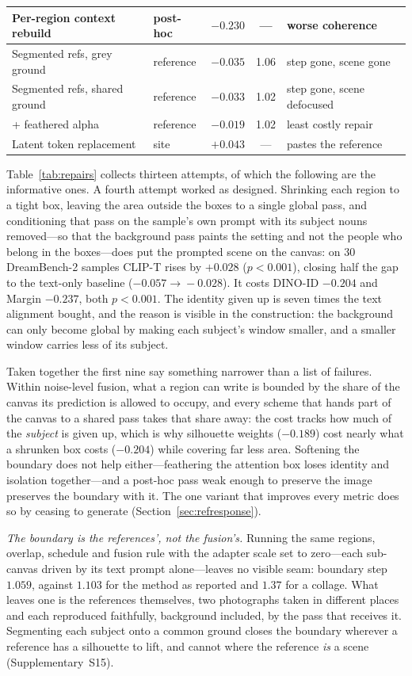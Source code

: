 \documentclass[review,10pt,times]{elsarticle}
\begin{document}
\begin{table}[htbp]
{\begin{tabular}{llccl}
Per-region context rebuild    & post-hoc & $-0.230$ & ---   & worse coherence \\
\midrule
Segmented refs, grey ground   & reference& $-0.035$ & 1.06  & step gone, scene gone \\
Segmented refs, shared ground & reference& $-0.033$ & 1.02  & step gone, scene defocused \\
\quad + feathered alpha       & reference& $-0.019$ & 1.02  & least costly repair \\
\midrule
Latent token replacement      & site     & $+0.043$ & ---   & pastes the reference \\
\bottomrule
\end{tabular}%
}
\end{table}

Table~\ref{tab:repairs} collects thirteen attempts, of which the following are
the informative ones.  A fourth attempt worked as designed.  Shrinking
each region to a tight box, leaving the area outside the boxes to a single
global pass, and conditioning that pass on the sample's own prompt with its
subject nouns removed---so that the background pass paints the setting and
not the people who belong in the boxes---does put the prompted scene on the
canvas: on 30 DreamBench-2 samples CLIP-T rises by $+0.028$
($p{<}0.001$), closing half the gap to the text-only baseline
($-0.057\!\to\!-0.028$).  It costs DINO-ID $-0.204$ and Margin $-0.237$,
both $p{<}0.001$.  The identity given up is seven times the text alignment
bought, and the reason is visible in the construction: the background can
only become global by making each subject's window smaller, and a smaller
window carries less of its subject.

Taken together the first nine say something narrower than a list of
failures.  Within noise-level fusion, what a region can write is bounded by
the share of the canvas its prediction is allowed to occupy, and every scheme
that hands part of the canvas to a shared pass takes that share away: the
cost tracks how much of the \emph{subject} is given up, which is why
silhouette weights ($-0.189$) cost nearly what a shrunken box costs
($-0.204$) while covering far less area.  Softening the boundary does not
help either---feathering the attention box loses identity and isolation
together---and a post-hoc pass weak enough to preserve the image preserves
the boundary with it.  The one variant that improves every metric does so by
ceasing to generate (Section~\ref{sec:refresponse}).

\noindent\textit{The boundary is the references', not the
fusion's.}
Running the same regions, overlap, schedule and fusion rule with the adapter
scale set to zero---each sub-canvas driven by its text prompt alone---leaves
no visible seam: boundary step $1.059$, against $1.103$ for the method as
reported and $1.37$ for a collage.  What leaves one is the references
themselves, two photographs taken in different places and each reproduced
faithfully, background included, by the pass that receives it.  Segmenting
each subject onto a common ground closes the boundary wherever a reference has
a silhouette to lift, and cannot where the reference \emph{is} a scene
(Supplementary~S15).
\end{document}
